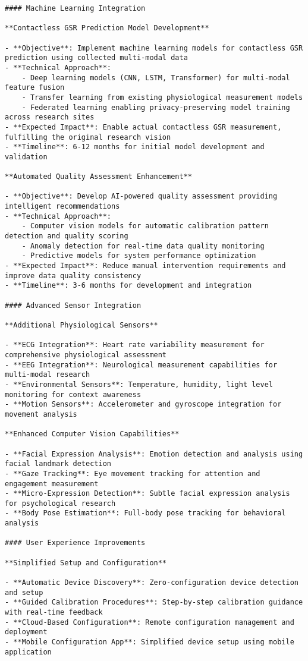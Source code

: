 \documentclass[12pt,a4paper]{report}
\begin{document}
\begin{verbatim}
#### Machine Learning Integration

**Contactless GSR Prediction Model Development**

- **Objective**: Implement machine learning models for contactless GSR prediction using collected multi-modal data
- **Technical Approach**:
    - Deep learning models (CNN, LSTM, Transformer) for multi-modal feature fusion
    - Transfer learning from existing physiological measurement models
    - Federated learning enabling privacy-preserving model training across research sites
- **Expected Impact**: Enable actual contactless GSR measurement, fulfilling the original research vision
- **Timeline**: 6-12 months for initial model development and validation

**Automated Quality Assessment Enhancement**

- **Objective**: Develop AI-powered quality assessment providing intelligent recommendations
- **Technical Approach**:
    - Computer vision models for automatic calibration pattern detection and quality scoring
    - Anomaly detection for real-time data quality monitoring
    - Predictive models for system performance optimization
- **Expected Impact**: Reduce manual intervention requirements and improve data quality consistency
- **Timeline**: 3-6 months for development and integration

#### Advanced Sensor Integration

**Additional Physiological Sensors**

- **ECG Integration**: Heart rate variability measurement for comprehensive physiological assessment
- **EEG Integration**: Neurological measurement capabilities for multi-modal research
- **Environmental Sensors**: Temperature, humidity, light level monitoring for context awareness
- **Motion Sensors**: Accelerometer and gyroscope integration for movement analysis

**Enhanced Computer Vision Capabilities**

- **Facial Expression Analysis**: Emotion detection and analysis using facial landmark detection
- **Gaze Tracking**: Eye movement tracking for attention and engagement measurement
- **Micro-Expression Detection**: Subtle facial expression analysis for psychological research
- **Body Pose Estimation**: Full-body pose tracking for behavioral analysis

#### User Experience Improvements

**Simplified Setup and Configuration**

- **Automatic Device Discovery**: Zero-configuration device detection and setup
- **Guided Calibration Procedures**: Step-by-step calibration guidance with real-time feedback
- **Cloud-Based Configuration**: Remote configuration management and deployment
- **Mobile Configuration App**: Simplified device setup using mobile application


\end{verbatim}
\end{document}
